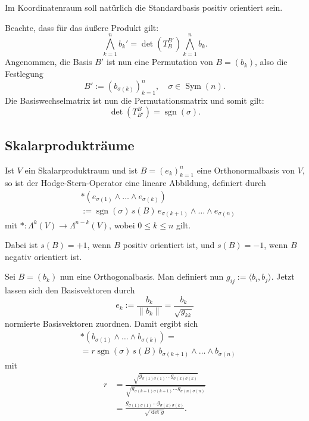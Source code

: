 \documentclass[a4paper,10pt,fleqn,twocolumn,twoside,dvipdfmx]{scrartcl}
\numberwithin{equation}{section}
\DeclareMathOperator{\sgn}{sgn}
\theoremstyle{rmbox}
\begin{document}
Im Koordinatenraum soll natürlich die Standardbasis positiv
orientiert sein.

Beachte, dass für das äußere Produkt gilt:
\begin{equation}
\bigwedge_{k=1}^n b_k' = \det(T_B^{B'}) \bigwedge_{k=1}^n b_k.
\end{equation}
Angenommen, die Basis $B'$ ist nun eine Permutation von $B=(b_k)$,
also die Festlegung
\begin{equation}
B' := (b_{\sigma(k)})_{k=1}^n, \quad \sigma\in\operatorname{Sym}(n).
\end{equation}
Die Basiswechselmatrix ist nun die Permutationsmatrix und somit gilt:
\begin{equation}
\det(T_{B'}^B) = \sgn(\sigma).
\end{equation}

\subsection{Skalarprodukträume}
Ist $V$ ein Skalarproduktraum und ist
$B=(e_k)_{k=1}^n$ eine Orthonormalbasis von $V$,
so ist der Hodge-Stern-Operator eine lineare Abbildung,
definiert durch%
\begin{equation}
\begin{split}
&*(e_{\sigma(1)}\wedge\ldots\wedge e_{\sigma(k)})\\
&:= \sgn(\sigma)\,s(B)\,e_{\sigma(k+1)}\wedge\ldots\wedge e_{\sigma(n)}
\end{split}
\end{equation}
mit $*\colon \Lambda^k(V)\to\Lambda^{n-k}(V)$,
wobei $0\le k\le n$ gilt.

Dabei ist $s(B)=+1$, wenn $B$ positiv orientiert ist,
und $s(B)=-1$, wenn $B$ negativ orientiert ist.

Sei $B=(b_k)$ nun eine Orthogonalbasis. Man definiert nun
$g_{ij}:=\langle b_i,b_j\rangle$. Jetzt lassen sich den
Basisvektoren durch
\begin{equation}
e_k := \frac{b_k}{\|b_k\|} = \frac{b_k}{\sqrt{g_{kk}}}
\end{equation}
normierte Basisvektoren zuordnen. Damit ergibt sich
\begin{equation}
\begin{split}
&*(b_{\sigma(1)}\wedge\ldots\wedge b_{\sigma(k)}) =\\
&= r \sgn(\sigma)\,s(B)\,b_{\sigma(k+1)}\wedge\ldots\wedge b_{\sigma(n)}
\end{split}
\end{equation}
mit
\begin{equation}
\begin{split}
r &= \frac{\sqrt{g_{\sigma(1)\sigma(1)}\ldots g_{\sigma(k)\sigma(k)}}}
{\sqrt{g_{\sigma(k+1)\sigma(k+1)}\ldots g_{\sigma(n)\sigma(n)}}}\\
&=\frac{g_{\sigma(1)\sigma(1)}\ldots g_{\sigma(k)\sigma(k)}}{\sqrt{\det g}}.
\end{split}
\end{equation}
\end{document}
